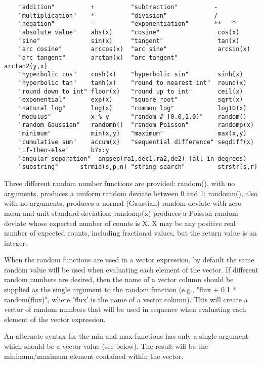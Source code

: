 \documentclass[11pt]{book}
\begin{document}
\begin{verbatim}
    "addition"          +          "subtraction"          -
    "multiplication"    *          "division"             /
    "negation"          -          "exponentiation"       **   ^
    "absolute value"    abs(x)     "cosine"                cos(x)
    "sine"              sin(x)     "tangent"               tan(x)
    "arc cosine"        arccos(x)  "arc sine"              arcsin(x)
    "arc tangent"       arctan(x)  "arc tangent"           arctan2(y,x)
    "hyperbolic cos"    cosh(x)    "hyperbolic sin"        sinh(x)
    "hyperbolic tan"    tanh(x)    "round to nearest int"  round(x)
    "round down to int" floor(x)   "round up to int"       ceil(x)
    "exponential"       exp(x)     "square root"           sqrt(x)
    "natural log"       log(x)     "common log"            log10(x)
    "modulus"           x % y      "random # [0.0,1.0)"    random()
    "random Gaussian"   randomn()  "random Poisson"        randomp(x)
    "minimum"           min(x,y)   "maximum"               max(x,y)
    "cumulative sum"    accum(x)   "sequential difference" seqdiff(x)
    "if-then-else"      b?x:y
    "angular separation"  angsep(ra1,dec1,ra2,de2) (all in degrees)
    "substring"      strmid(s,p,n) "string search"         strstr(s,r)
\end{verbatim}
Three different random number functions are provided:  random(), with
no arguments, produces a uniform random deviate between 0 and 1;
randomn(), also with no arguments, produces a normal (Gaussian) random
deviate  with zero mean and unit standard deviation; randomp(x)
produces a Poisson random deviate whose expected number of counts is
X.  X may be any positive real number of expected counts, including
fractional values, but the return value is an integer.

When the random functions are used in a vector expression, by default
the same random value will be used when evaluating each element of the vector.
If different random numbers are desired, then the name of a vector
column should be supplied as the single argument to the random
function (e.g., "flux + 0.1 * random(flux)", where "flux' is the
name of a vector column).  This will create a vector of
random numbers that will be used in sequence when evaluating each
element of the vector expression.

An alternate syntax for the min and max functions  has only a single
argument which  should be  a  vector value (see  below).  The result
will be the minimum/maximum element contained within the vector.
\end{document}
